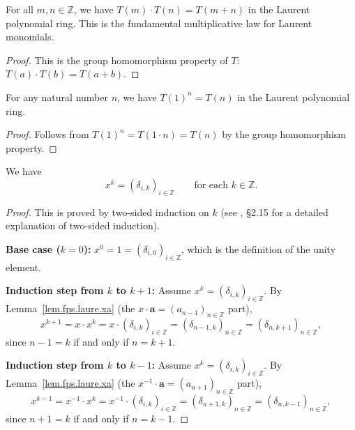 \begin{lemma}[$T(m) \cdot T(n) = T(m + n)$]
\label{lem.fps.laure.T-mul-T}
\leanhelper
\leanok
For all $m, n \in \mathbb{Z}$, we have $T(m) \cdot T(n) = T(m + n)$
in the Laurent polynomial ring. This is the fundamental multiplicative
law for Laurent monomials.
\end{lemma}

\begin{proof}
\leanok
This is the group homomorphism property of $T$: $T(a) \cdot T(b) = T(a+b)$.
\end{proof}

\begin{lemma}[$T(1)^n = T(n)$ for natural numbers]
\label{lem.fps.laure.T-one-pow}
\leanhelper
\leanok
For any natural number $n$, we have $T(1)^n = T(n)$ in the Laurent
polynomial ring.
\end{lemma}

\begin{proof}
\leanok
Follows from $T(1)^n = T(1 \cdot n) = T(n)$ by the group homomorphism property.
\end{proof}

\begin{proposition}[$x^k = (\delta_{i,k})_{i \in \mathbb{Z}}$ for all $k \in \mathbb{Z}$]
\label{prop.fps.laure.xk}
\leantarget
\leanok
We have
\[
  x^k = \left(\delta_{i,k}\right)_{i \in \mathbb{Z}}
  \qquad \text{for each } k \in \mathbb{Z}.
\]
\end{proposition}

\begin{proof}
This is proved by two-sided induction on $k$ (see \cite{detnotes},
\S 2.15 for a detailed explanation of two-sided induction).

\textbf{Base case ($k = 0$):}
$x^0 = 1 = \left(\delta_{i,0}\right)_{i \in \mathbb{Z}}$, which is the
definition of the unity element.

\textbf{Induction step from $k$ to $k+1$:}
Assume $x^k = \left(\delta_{i,k}\right)_{i \in \mathbb{Z}}$.
By Lemma~\ref{lem.fps.laure.xa} (the
$x \cdot \mathbf{a} = \left(a_{n-1}\right)_{n \in \mathbb{Z}}$ part),
\[
  x^{k+1} = x \cdot x^k
  = x \cdot \left(\delta_{i,k}\right)_{i \in \mathbb{Z}}
  = \left(\delta_{n-1,k}\right)_{n \in \mathbb{Z}}
  = \left(\delta_{n,k+1}\right)_{n \in \mathbb{Z}},
\]
since $n - 1 = k$ if and only if $n = k + 1$.

\textbf{Induction step from $k$ to $k-1$:}
Assume $x^k = \left(\delta_{i,k}\right)_{i \in \mathbb{Z}}$.
By Lemma~\ref{lem.fps.laure.xa} (the
$x^{-1} \cdot \mathbf{a} = \left(a_{n+1}\right)_{n \in \mathbb{Z}}$ part),
\[
  x^{k-1} = x^{-1} \cdot x^k
  = x^{-1} \cdot \left(\delta_{i,k}\right)_{i \in \mathbb{Z}}
  = \left(\delta_{n+1,k}\right)_{n \in \mathbb{Z}}
  = \left(\delta_{n,k-1}\right)_{n \in \mathbb{Z}},
\]
since $n + 1 = k$ if and only if $n = k - 1$.
\end{proof}

